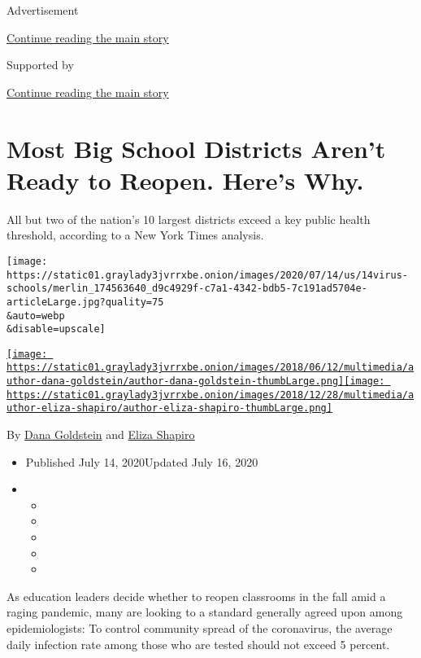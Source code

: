 Advertisement

\protect\hyperlink{after-top}{Continue reading the main story}

Supported by

\protect\hyperlink{after-sponsor}{Continue reading the main story}

\hypertarget{most-big-school-districts-arent-ready-to-reopen-heres-why}{%
\section{Most Big School Districts Aren't Ready to Reopen. Here's
Why.}\label{most-big-school-districts-arent-ready-to-reopen-heres-why}}

All but two of the nation's 10 largest districts exceed a key public
health threshold, according to a New York Times analysis.

\texttt{[image: https://static01.graylady3jvrrxbe.onion/images/2020/07/14/us/14virus-schools/merlin\_174563640\_d9c4929f-c7a1-4342-bdb5-7c191ad5704e-articleLarge.jpg?quality=75\\\&auto=webp\\\&disable=upscale]}

\href{https://www.nytimes3xbfgragh.onion/by/dana-goldstein}{\texttt{[image: https://static01.graylady3jvrrxbe.onion/images/2018/06/12/multimedia/author-dana-goldstein/author-dana-goldstein-thumbLarge.png]}}\href{https://www.nytimes3xbfgragh.onion/by/eliza-shapiro}{\texttt{[image: https://static01.graylady3jvrrxbe.onion/images/2018/12/28/multimedia/author-eliza-shapiro/author-eliza-shapiro-thumbLarge.png]}}

By \href{https://www.nytimes3xbfgragh.onion/by/dana-goldstein}{Dana
Goldstein} and
\href{https://www.nytimes3xbfgragh.onion/by/eliza-shapiro}{Eliza
Shapiro}

\begin{itemize}
\item
  Published July 14, 2020Updated July 16, 2020
\item
  \begin{itemize}
  \item
  \item
  \item
  \item
  \item
  \end{itemize}
\end{itemize}

As education leaders decide whether to reopen classrooms in the fall
amid a raging pandemic, many are looking to a standard generally agreed
upon among epidemiologists: To control community spread of the
coronavirus, the average daily infection rate among those who are tested
should not exceed 5 percent.

